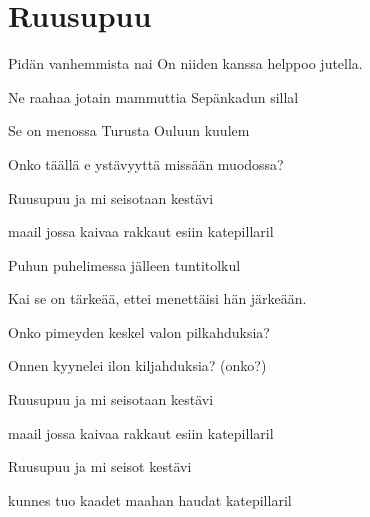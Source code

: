 \documentclass[12pt,a4paper]{article}
\begin{document}
\thispagestyle{empty}
\section*{Ruusupuu}


\begin{SBVerse}
Pidän vanhemmista nai On niiden kanssa helppoo
jutella.

Ne raahaa jotain mammuttia Sepänkadun
sillal

Se on menossa Turusta Ouluun kuulem

Onko täällä e ystävyyttä missään muodossa?
\end{SBVerse}

\begin{SBChorus}
Ruusupuu ja mi 
seisotaan kestävi 

maail jossa kaivaa 
rakkaut esiin 
katepillaril
\end{SBChorus}

\begin{SBVerse*}
  
\end{SBVerse*}

\begin{SBVerse}
Puhun puhelimessa jälleen tuntitolkul

Kai se on tärkeää, ettei menettäisi hän
järkeään.

Onko pimeyden keskel valon pilkahduksia?

Onnen kyynelei ilon kiljahduksia? (onko?)
\end{SBVerse}

\begin{SBChorus}
Ruusupuu ja mi 
seisotaan kestävi 

maail jossa kaivaa 
rakkaut esiin  katepillaril

Ruusupuu ja mi 
seisot kestävi 

kunnes  tuo kaadet 
maahan haudat
katepillaril
\end{SBChorus}
\end{document}
